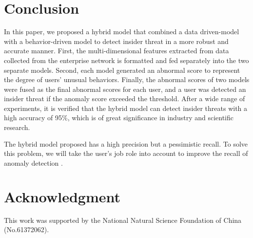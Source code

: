 \documentclass[conference]{IEEEtran}
\begin{document}
\section{Conclusion}

In this paper, we proposed a hybrid model that combined a data driven-model with a behavior-driven model to detect insider threat in a more robust and accurate manner. 
First, the multi-dimensional features extracted from data collected from the enterprise network is formatted and fed separately into the two separate models. Second, each model generated an abnormal score to represent the degree of users' unusual behaviors. Finally, the abnormal scores of two models were fused as the final abnormal scores for each user, and a user was detected an insider threat if the anomaly score exceeded the threshold. After a wide range of experiments, it is verified that the hybrid model can detect insider threats with a high accuracy of 95\%, which is of great significance in industry and scientific research.

The hybrid model proposed has a high precision but a pessimistic recall. To solve this problem, we will take the user’s job role into account to improve the recall of anomaly detection  \cite{b16}.       



\section*{Acknowledgment}

This work was supported by the National Natural Science Foundation of China (No.61372062).
\end{document}
